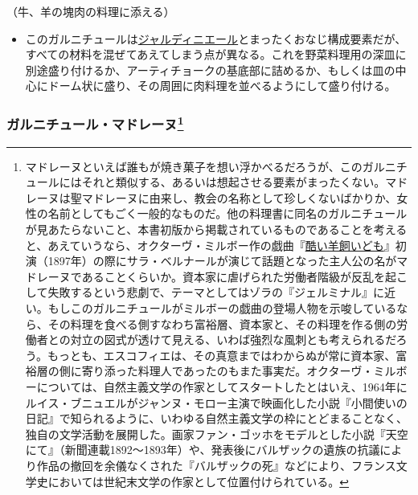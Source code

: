 \begin{recette}


（牛、羊の塊肉の料理に添える）

\begin{itemize}
\tightlist
\item
  このガルニチュールは\protect\hyperlink{garniture-jardiniere}{ジャルディニエール}とまったくおなじ構成要素だが、すべての材料を混ぜてあえてしまう点が異なる。これを野菜料理用の深皿に別途盛り付けるか、アーティチョークの基底部に詰めるか、もしくは皿の中心にドーム状に盛り、その周囲に肉料理を並べるようにして盛り付ける。
\end{itemize}

\atoaki{}

\hypertarget{garniture-madeleine}{%
\subsubsection[ガルニチュール・マドレーヌ]{\texorpdfstring{ガルニチュール・マドレーヌ\footnote{マドレーヌといえば誰もが焼き菓子を想い浮かべるだろうが、このガルニチュールにはそれと類似する、あるいは想起させる要素がまったくない。マドレーヌは聖マドレーヌに由来し、教会の名称として珍しくないばかりか、女性の名前としてもごく一般的なものだ。他の料理書に同名のガルニチュールが見あたらないこと、本書初版から掲載されているものであることを考えると、あえていうなら、オクターヴ・ミルボー作の戯曲『\href{http://gallica.bnf.fr/ark:/12148/bpt6k203007v}{酷い羊飼いども}』初演（1897年）の際にサラ・ベルナールが演じて話題となった主人公の名がマドレーヌであることくらいか。資本家に虐げられた労働者階級が反乱を起こして失敗するという悲劇で、テーマとしてはゾラの『ジェルミナル』に近い。もしこのガルニチュールがミルボーの戯曲の登場人物を示唆しているなら、その料理を食べる側すなわち富裕層、資本家と、その料理を作る側の労働者との対立の図式が透けて見える、いわば強烈な風刺とも考えられるだろう。もっとも、エスコフィエは、その真意まではわからぬが常に資本家、富裕層の側に寄り添った料理人であったのもまた事実だ。オクターヴ・ミルボーについては、自然主義文学の作家としてスタートしたとはいえ、1964年にルイス・ブニュエルがジャンヌ・モロー主演で映画化した小説『小間使いの日記』で知られるように、いわゆる自然主義文学の枠にとどまることなく、独自の文学活動を展開した。画家ファン・ゴッホをモデルとした小説『天空にて』（新聞連載1892〜1893年）や、発表後にバルザックの遺族の抗議により作品の撤回を余儀なくされた『バルザックの死』などにより、フランス文学史においては世紀末文学の作家として位置付けられている。}}{ガルニチュール・マドレーヌ}}\label{garniture-madeleine}}


\end{recette}
